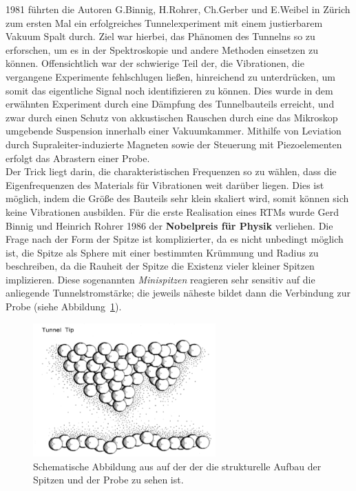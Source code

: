 1981 führten die Autoren G.Binnig, H.Rohrer,
Ch.Gerber und E.Weibel in Zürich zum ersten Mal ein erfolgreiches
Tunnelexperiment \cite{binnig1982tunneling} 
mit einem justierbarem Vakuum Spalt durch. 
Ziel war hierbei, das Phänomen des Tunnelns so zu erforschen,
um es in der Spektroskopie und andere Methoden einsetzen zu können. 
Offensichtlich war der schwierige Teil der, die Vibrationen,
die vergangene Experimente fehlschlugen ließen, hinreichend zu
unterdrücken, um somit das eigentliche Signal noch identifizieren zu
können. Dies wurde in dem erwähnten Experiment durch eine 
Dämpfung des Tunnelbauteils erreicht, und zwar durch einen Schutz
von akkustischen Rauschen durch eine das Mikroskop umgebende 
Suspension innerhalb einer Vakuumkammer. 
Mithilfe von Leviation durch Supraleiter-induzierte Magneten sowie
der Steuerung mit Piezoelementen erfolgt das Abrastern einer
Probe. \\ Der Trick liegt darin,
die charakteristischen Frequenzen so zu wählen, dass die 
Eigenfrequenzen des Materials für Vibrationen weit darüber liegen.
Dies ist möglich, indem die Größe des Bauteils sehr klein
skaliert wird, somit können sich keine Vibrationen ausbilden.
Für die erste Realisation eines RTMs  
wurde Gerd Binnig und Heinrich Rohrer 1986 der \textbf{Nobelpreis
für Physik} verliehen. 
Die Frage nach der Form der Spitze ist komplizierter, da es 
nicht unbedingt möglich ist, die Spitze als Sphere mit einer
bestimmten Krümmung und Radius zu beschreiben, da die Rauheit der
Spitze die Existenz vieler kleiner Spitzen implizieren. Diese
sogenannten \textit{Minispitzen} reagieren sehr sensitiv auf die anliegende
Tunnelstromstärke; die jeweils näheste bildet dann die Verbindung
zur Probe (siehe Abbildung~\ref{fig:multitip}).\\ 
\begin{figure}
\includegraphics[width=7cm]{pics/multitip}
\caption{ Schematische Abbildung aus \cite{binnig1987scanning}
auf der der die strukturelle Aufbau der Spitzen und der Probe 
zu sehen ist.} 
 \label{fig:multitip}
\end{figure}

